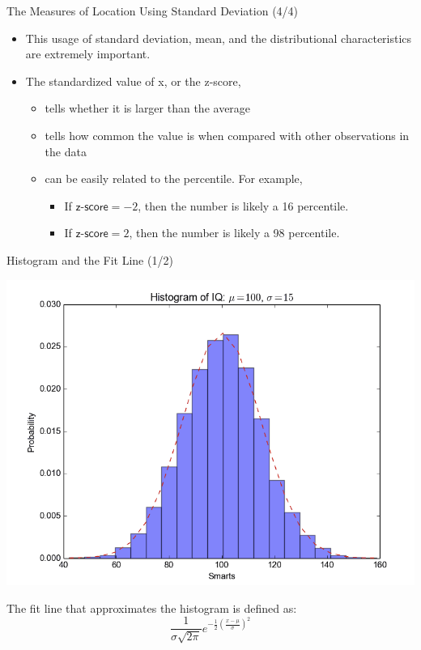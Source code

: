 \documentclass{beamer}
\begin{document}
\begin{frame}{The Measures of Location Using Standard Deviation (4/4)}

\begin{itemize}
\item This usage of standard deviation, mean, and the distributional characteristics are extremely important.
\item The standardized value of x, or the z-score,  
\begin{itemize}
\item tells whether it is larger than the average
\item tells how common the value is when compared with other observations in the data
\item can be easily related to the percentile. For example,
\begin{itemize}
\item If $\textsf{z-score}=-2$, then the number is likely a 16 percentile. 
\item If $\textsf{z-score}= 2$, then the number is likely a 98 percentile. 
\end{itemize}

\end{itemize}
\end{itemize}

\end{frame}



\begin{frame}{Histogram and the Fit Line (1/2)}


\begin{center}
\includegraphics[scale=0.3]{images/ch2HistogramFitting.png}
\end{center}
The fit line that approximates the histogram is defined as: 
$$ \frac{1}{\sigma\sqrt{2\pi}} e^{-\frac{1}{2} \left(   \frac{x-\mu}{\sigma}\right)^2} $$

\end{frame}
\end{document}
